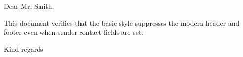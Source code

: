 \documentclass[basic, lang=english]{../../onlinebrief24}
\begin{document}
\begin{letter}{}
\opening{Dear Mr. Smith,}

This document verifies that the basic style suppresses the modern header
and footer even when sender contact fields are set.

\closing{Kind regards}
\end{letter}
\end{document}
